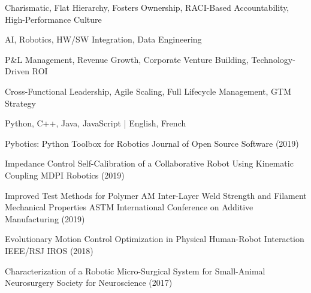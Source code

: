 \documentclass[11pt, letterpaper]{awesome-cv}
\begin{document}
\begin{cvskills}

{Charismatic, Flat Hierarchy, Fosters Ownership, RACI-Based Accountability, High-Performance Culture}

{AI, Robotics, HW/SW Integration, Data Engineering}

{P\&L Management, Revenue Growth, Corporate Venture Building, Technology-Driven ROI}

{Cross-Functional Leadership, Agile Scaling, Full Lifecycle Management, GTM Strategy}

{Python, C++, Java, JavaScript | English, French}

\end{cvskills}

\begin{cvhonors}

\cvhonor
{Pybotics: Python Toolbox for Robotics}
{Journal of Open Source Software (2019)}
{}
{}

\cvhonor
{Impedance Control Self-Calibration of a Collaborative Robot Using Kinematic Coupling}
{MDPI Robotics (2019)}
{}
{}

\cvhonor
{Improved Test Methods for Polymer AM Inter-Layer Weld Strength and Filament Mechanical Properties}
{ASTM International Conference on Additive Manufacturing (2019)}
{}
{}

\cvhonor
{Evolutionary Motion Control Optimization in Physical Human-Robot Interaction}
{IEEE/RSJ IROS (2018)}
{}
{}

\cvhonor
{Characterization of a Robotic Micro-Surgical System for Small-Animal Neurosurgery}
{Society for Neuroscience (2017)}
{}
{}

\end{cvhonors}
\end{document}
